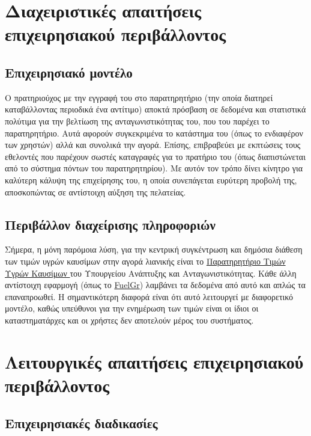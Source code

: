 \documentclass[a4paper,oneside, 12pt]{article}
\begin{document}
\section{Διαχειριστικές απαιτήσεις επιχειρησιακού περιβάλλοντος}

\subsection{Επιχειρησιακό μοντέλο}

Ο πρατηριούχος με την εγγραφή του στο παρατηρητήριο (την οποία διατηρεί
καταβάλλοντας περιοδικά ένα αντίτιμο) αποκτά πρόσβαση σε δεδομένα και στατιστικά
πολύτιμα για την βελτίωση της ανταγωνιστικότητας του, που του παρέχει το
παρατηρητήριο. Αυτά αφορούν συγκεκριμένα το κατάστημα του (όπως το ενδιαφέρον
των χρηστών) αλλά και συνολικά την αγορά. Επίσης, επιβραβεύει με εκπτώσεις τους
εθελοντές που παρέχουν σωστές καταγραφές για το πρατήριο του (όπως διαπιστώνεται
από το σύστημα πόντων του παρατηρητηρίου). Με αυτόν τον τρόπο δίνει κίνητρο για καλύτερη κάλυψη της επιχείρησης του, η οποία συνεπάγεται ευρύτερη προβολή της,
αποσκοπώντας σε αντίστοιχη αύξηση της πελατείας.

\subsection{Περιβάλλον διαχείρισης πληροφοριών}

Σήμερα, η μόνη παρόμοια λύση, για την κεντρική συγκέντρωση και δημόσια διάθεση των
τιμών υγρών καυσίμων στην αγορά λιανικής είναι το \href{http://www.fuelprices.gr/}
{Παρατηρητήριο Τιμών Υγρών Καυσίμων } του Υπουργείου Ανάπτυξης και Ανταγωνιστικότητας.
Κάθε άλλη αντίστοιχη εφαρμογή (όπως το \href{https://fuelgr.gr/}{FuelGr})
λαμβάνει τα δεδομένα από αυτό και απλώς τα επαναπροωθεί. Η σημαντικότερη διαφορά
είναι ότι αυτό λειτουργεί με διαφορετικό μοντέλο, καθώς υπεύθυνοι για την ενημέρωση
των τιμών είναι οι ίδιοι οι καταστηματάρχες και οι χρήστες δεν αποτελούν μέρος του
συστήματος.

\section{Λειτουργικές απαιτήσεις επιχειρησιακού περιβάλλοντος}

\subsection{Επιχειρησιακές διαδικασίες}
\end{document}
